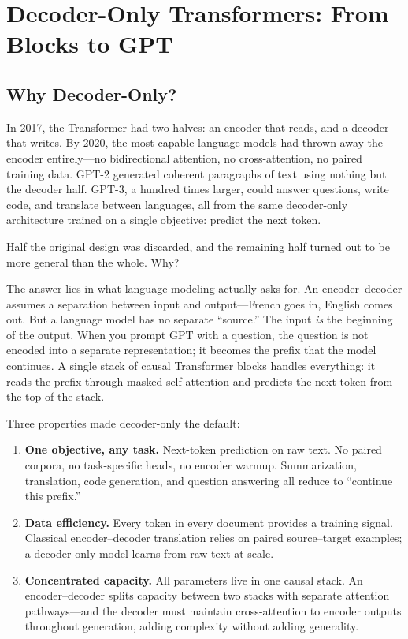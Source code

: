 \chapter{Decoder-Only Transformers: From Blocks to GPT}
\label{ch:decoder-only}

\section{Why Decoder-Only?}

In 2017, the Transformer had two halves: an encoder that reads, and a decoder that writes. By 2020, the most capable language models had thrown away the encoder entirely---no bidirectional attention, no cross-attention, no paired training data. GPT-2 generated coherent paragraphs of text using nothing but the decoder half. GPT-3, a hundred times larger, could answer questions, write code, and translate between languages, all from the same decoder-only architecture trained on a single objective: predict the next token.

Half the original design was discarded, and the remaining half turned out to be more general than the whole. Why?

The answer lies in what language modeling actually asks for. An encoder--decoder assumes a separation between input and output---French goes in, English comes out. But a language model has no separate ``source.'' The input \emph{is} the beginning of the output. When you prompt GPT with a question, the question is not encoded into a separate representation; it becomes the prefix that the model continues. A single stack of causal Transformer blocks handles everything: it reads the prefix through masked self-attention and predicts the next token from the top of the stack.

Three properties made decoder-only the default:

\begin{enumerate}[nosep]
  \item \textbf{One objective, any task.} Next-token prediction on raw text. No paired corpora, no task-specific heads, no encoder warmup. Summarization, translation, code generation, and question answering all reduce to ``continue this prefix.''
  \item \textbf{Data efficiency.} Every token in every document provides a training signal. Classical encoder--decoder translation relies on paired source--target examples; a decoder-only model learns from raw text at scale.
  \item \textbf{Concentrated capacity.} All parameters live in one causal stack. An encoder--decoder splits capacity between two stacks with separate attention pathways---and the decoder must maintain cross-attention to encoder outputs throughout generation, adding complexity without adding generality.
\end{enumerate}

